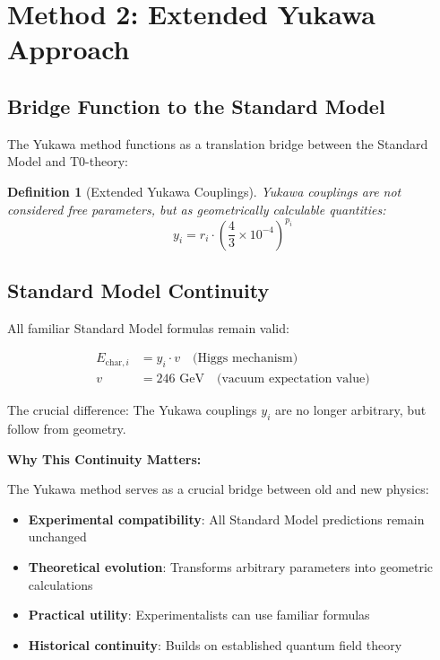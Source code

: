 \documentclass[12pt,a4paper]{article}
\newtheorem{definition}[theorem]{Definition}
\begin{document}
	\section{Method 2: Extended Yukawa Approach}
	\label{sec:yukawa_method}
	
	\subsection{Bridge Function to the Standard Model}
	\label{subsec:bridge_function}
	
	The Yukawa method functions as a translation bridge between the Standard Model and T0-theory:
	
	\begin{definition}[Extended Yukawa Couplings]
		Yukawa couplings are not considered free parameters, but as geometrically calculable quantities:
		\begin{equation}
			y_i = r_i \cdot \left(\frac{4}{3} \times 10^{-4}\right)^{p_i}
			\label{eq:yukawa_couplings}
		\end{equation}
	\end{definition}
	
	\subsection{Standard Model Continuity}
	\label{subsec:standard_model_continuity}
	
	All familiar Standard Model formulas remain valid:
	
	\begin{align}
		E_{\text{char},i} &= y_i \cdot v \quad \text{(Higgs mechanism)} \\
		v &= 246 \text{ GeV} \quad \text{(vacuum expectation value)}
	\end{align}
	
	The crucial difference: The Yukawa couplings $y_i$ are no longer arbitrary, but follow from geometry.
	
	\textbf{Why This Continuity Matters:}
	
	The Yukawa method serves as a crucial bridge between old and new physics:
	
	\begin{itemize}
		\item \textbf{Experimental compatibility}: All Standard Model predictions remain unchanged
		\item \textbf{Theoretical evolution}: Transforms arbitrary parameters into geometric calculations
		\item \textbf{Practical utility}: Experimentalists can use familiar formulas
		\item \textbf{Historical continuity}: Builds on established quantum field theory
	\end{itemize}
	
\end{document}
